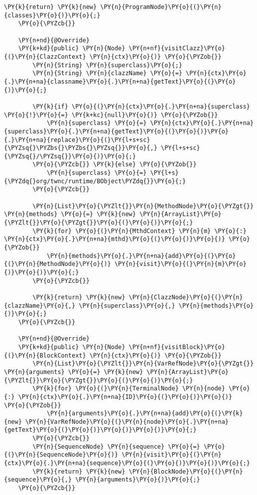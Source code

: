 \begin{Verbatim}[commandchars=\\\{\}]
        \PY{k}{return} \PY{k}{new} \PY{n}{ProgramNode}\PY{o}{(}\PY{n}{classes}\PY{o}{)}\PY{o}{;}
    \PY{o}{\PYZcb{}}

    \PY{n+nd}{@Override}
    \PY{k+kd}{public} \PY{n}{Node} \PY{n+nf}{visitClazz}\PY{o}{(}\PY{n}{ClazzContext} \PY{n}{ctx}\PY{o}{)} \PY{o}{\PYZob{}}
        \PY{n}{String} \PY{n}{superclass}\PY{o}{;}
        \PY{n}{String} \PY{n}{clazzName} \PY{o}{=} \PY{n}{ctx}\PY{o}{.}\PY{n+na}{classname}\PY{o}{.}\PY{n+na}{getText}\PY{o}{(}\PY{o}{)}\PY{o}{;}

        \PY{k}{if} \PY{o}{(}\PY{n}{ctx}\PY{o}{.}\PY{n+na}{superclass} \PY{o}{!}\PY{o}{=} \PY{k+kc}{null}\PY{o}{)} \PY{o}{\PYZob{}}
            \PY{n}{superclass} \PY{o}{=} \PY{n}{ctx}\PY{o}{.}\PY{n+na}{superclass}\PY{o}{.}\PY{n+na}{getText}\PY{o}{(}\PY{o}{)}\PY{o}{.}\PY{n+na}{replace}\PY{o}{(}\PY{l+s+sc}{\PYZsq{}\PYZbs{}\PYZbs{}\PYZsq{}}\PY{o}{,} \PY{l+s+sc}{\PYZsq{}/\PYZsq{}}\PY{o}{)}\PY{o}{;}
        \PY{o}{\PYZcb{}} \PY{k}{else} \PY{o}{\PYZob{}}
            \PY{n}{superclass} \PY{o}{=} \PY{l+s}{\PYZdq{}org/twnc/runtime/BObject\PYZdq{}}\PY{o}{;}
        \PY{o}{\PYZcb{}}

        \PY{n}{List}\PY{o}{\PYZlt{}}\PY{n}{MethodNode}\PY{o}{\PYZgt{}} \PY{n}{methods} \PY{o}{=} \PY{k}{new} \PY{n}{ArrayList}\PY{o}{\PYZlt{}}\PY{o}{\PYZgt{}}\PY{o}{(}\PY{o}{)}\PY{o}{;}
        \PY{k}{for} \PY{o}{(}\PY{n}{MthdContext} \PY{n}{m} \PY{o}{:} \PY{n}{ctx}\PY{o}{.}\PY{n+na}{mthd}\PY{o}{(}\PY{o}{)}\PY{o}{)} \PY{o}{\PYZob{}}
            \PY{n}{methods}\PY{o}{.}\PY{n+na}{add}\PY{o}{(}\PY{o}{(}\PY{n}{MethodNode}\PY{o}{)} \PY{n}{visit}\PY{o}{(}\PY{n}{m}\PY{o}{)}\PY{o}{)}\PY{o}{;}
        \PY{o}{\PYZcb{}}
        
        \PY{k}{return} \PY{k}{new} \PY{n}{ClazzNode}\PY{o}{(}\PY{n}{clazzName}\PY{o}{,} \PY{n}{superclass}\PY{o}{,} \PY{n}{methods}\PY{o}{)}\PY{o}{;}
    \PY{o}{\PYZcb{}}

    \PY{n+nd}{@Override}
    \PY{k+kd}{public} \PY{n}{Node} \PY{n+nf}{visitBlock}\PY{o}{(}\PY{n}{BlockContext} \PY{n}{ctx}\PY{o}{)} \PY{o}{\PYZob{}}
        \PY{n}{List}\PY{o}{\PYZlt{}}\PY{n}{VarRefNode}\PY{o}{\PYZgt{}} \PY{n}{arguments} \PY{o}{=} \PY{k}{new} \PY{n}{ArrayList}\PY{o}{\PYZlt{}}\PY{o}{\PYZgt{}}\PY{o}{(}\PY{o}{)}\PY{o}{;}
        \PY{k}{for} \PY{o}{(}\PY{n}{TerminalNode} \PY{n}{node} \PY{o}{:} \PY{n}{ctx}\PY{o}{.}\PY{n+na}{ID}\PY{o}{(}\PY{o}{)}\PY{o}{)} \PY{o}{\PYZob{}}
            \PY{n}{arguments}\PY{o}{.}\PY{n+na}{add}\PY{o}{(}\PY{k}{new} \PY{n}{VarRefNode}\PY{o}{(}\PY{n}{node}\PY{o}{.}\PY{n+na}{getText}\PY{o}{(}\PY{o}{)}\PY{o}{)}\PY{o}{)}\PY{o}{;}
        \PY{o}{\PYZcb{}}
        \PY{n}{SequenceNode} \PY{n}{sequence} \PY{o}{=} \PY{o}{(}\PY{n}{SequenceNode}\PY{o}{)} \PY{n}{visit}\PY{o}{(}\PY{n}{ctx}\PY{o}{.}\PY{n+na}{sequence}\PY{o}{(}\PY{o}{)}\PY{o}{)}\PY{o}{;}
        \PY{k}{return} \PY{k}{new} \PY{n}{BlockNode}\PY{o}{(}\PY{n}{sequence}\PY{o}{,} \PY{n}{arguments}\PY{o}{)}\PY{o}{;}
    \PY{o}{\PYZcb{}}


\end{Verbatim}
